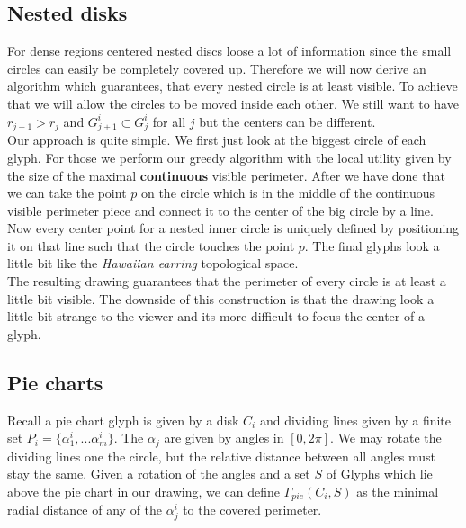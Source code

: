 \documentclass[a4paper,11pt]{article}
\begin{document}
\subsection{Nested disks}

For dense regions centered nested discs loose a lot of information since the small circles can easily be completely covered up. Therefore we will now derive an algorithm which guarantees, that every nested circle is at least visible. To achieve that we will allow the circles to be moved inside each other. We still want to have $r_{j+1}>r_j$ and $G^i_{j+1}\subset G^i_j$ for all $j$ but the centers can be different.\\

Our approach is quite simple. We first just look at the biggest circle of each glyph. For those we perform our greedy algorithm with the local utility given by the size of the maximal \textbf{continuous} visible perimeter. After we have done that we can take the point $p$ on the circle which is in the middle of the continuous visible perimeter piece and connect it to the center of the big circle by a line. Now every center point for a nested inner circle is uniquely defined by positioning it on that line such that the circle touches the point $p$. The final glyphs look a little bit like the \textit{Hawaiian earring} topological space.\\

The resulting drawing guarantees that the perimeter of every circle is at least a little bit visible. The downside of this construction is that the drawing look a little bit strange to the viewer and its more difficult to focus the center of a glyph.




\subsection{Pie charts}
Recall a pie chart glyph is given by a disk $C_i$ and dividing lines given by a finite set $P_i= \{\alpha_1^i,...\alpha_m^i\}$. The $\alpha_j$ are given by angles in $[0,2\pi ]$. We may rotate the dividing lines one the circle, but the relative distance between all angles must stay the same. Given a rotation of the angles and a set $S$ of Glyphs which lie above the pie chart in our drawing, we can define $\Gamma_{pie}(C_i,S)$ as the minimal radial distance of any of the $\alpha^i_j$ to the covered perimeter. \\ \\
\end{document}
